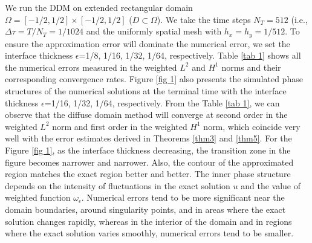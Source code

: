 \documentclass[3p,times]{elsarticle}
\numberwithin{equation}{section}
\begin{document}
We run the DDM  on extended rectangular domain $\Omega=[-1/2,1/2]\times[-1/2, 1/2]$ ($D\subset\Omega$). We take the time steps $N_T=512$ (i.e., $\Delta \tau = T/N_T=1/1024$ and the uniformly spatial mesh with  $h_x = h_y=1/512$. 
To ensure the approximation error will dominate the numerical error, we set the interface thickness $\epsilon$=1/8, 1/16, 1/32, 1/64, respectively. Table \ref{tab 1} shows all the numerical errors measured in the weighted $L^2$ and $H^1$ norms and their corresponding convergence rates. Figure \ref{fig 1} also presents the simulated phase structures of the numerical solutions at the terminal time with the interface thickness $\epsilon$=1/16, 1/32, 1/64, respectively. From the Table \ref{tab 1}, we can observe that the diffuse domain method will converge at second order in the weighted $L^2$ norm and first order in the weighted $H^1$ norm, which coincide very well with the error estimates derived in Theorems \ref{thm3} and \ref{thm5}. For the Figure \ref{fig 1}, as the interface thickness decreasing, the transition zone in the figure becomes narrower and narrower. Also, the contour of the approximated region matches the exact region better and better. The inner phase structure depends on the intensity of fluctuations in the exact solution $u$ and the value of weighted function $\omega_{\epsilon}$. Numerical errors tend to be more significant near the domain boundaries, around singularity points, and in areas where the exact solution changes rapidly, whereas in the interior of the domain and in regions where the exact solution varies smoothly, numerical errors tend to be smaller.

\end{document}
